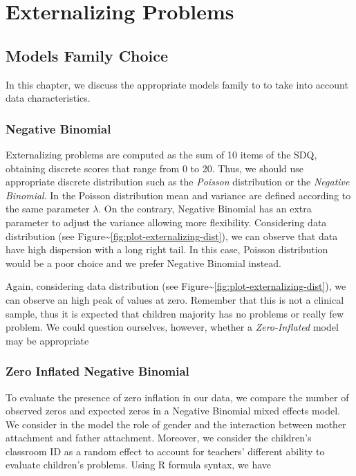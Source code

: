\documentclass[
]{book}
\begin{document}
\hypertarget{part-externalizing-problems}{%
\part*{Externalizing Problems}\label{part-externalizing-problems}}

\hypertarget{model-choice-ext}{%
\chapter{Models Family Choice}\label{model-choice-ext}}

In this chapter, we discuss the appropriate models family to to take into account data characteristics.

\hypertarget{negative-binomial}{%
\section{Negative Binomial}\label{negative-binomial}}

Externalizing problems are computed as the sum of 10 items of the SDQ, obtaining discrete scores that range from 0 to 20. Thus, we should use appropriate discrete distribution such as the \emph{Poisson} distribution or the \emph{Negative Binomial}. In the Poisson distribution mean and variance are defined according to the same parameter \(\lambda\). On the contrary, Negative Binomial has an extra parameter to adjust the variance allowing more flexibility. Considering data distribution (see Figure\textasciitilde\ref{fig:plot-externalizing-dist}), we can observe that data have high dispersion with a long right tail. In this case, Poisson distribution would be a poor choice and we prefer Negative Binomial instead.

Again, considering data distribution (see Figure\textasciitilde\ref{fig:plot-externalizing-dist}), we can observe an high peak of values at zero. Remember that this is not a clinical sample, thus it is expected that children majority has no problems or really few problem. We could question ourselves, however, whether a \emph{Zero-Inflated} model may be appropriate

\hypertarget{zero-inflated-negative-binomial}{%
\section{Zero Inflated Negative Binomial}\label{zero-inflated-negative-binomial}}

To evaluate the presence of zero inflation in our data, we compare the number of observed zeros and expected zeros in a Negative Binomial mixed effects model. We consider in the model the role of gender and the interaction between mother attachment and father attachment. Moreover, we consider the children's classroom ID as a random effect to account for teachers' different ability to evaluate children's problems. Using R formula syntax, we have
\end{document}
